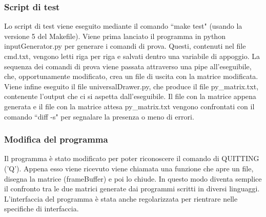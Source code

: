 \documentclass{article}
\begin{document}
	\subsubsection*{Script di test}
	Lo script di test viene eseguito mediante il comando ``make test" (usando la versione 5 del Makefile). Viene prima lanciato il programma in python inputGenerator.py per generare i comandi di prova. Questi,
        contenuti nel file cmd.txt, vengono letti riga per riga e salvati dentro una variabile di appoggio.
        La sequenza dei comandi di prova viene passata attraverso una pipe all'eseguibile, che, opportunamente modificato, crea un file di uscita con la matrice modificata.
        Viene infine eseguito il file universalDrawer.py, che produce il file py\_matrix.txt, contenente l'output che ci si aspetta dall'eseguibile.
        Il file con la matrice appena generata e il file con la matrice attesa py\_matrix.txt vengono confrontati con il comando ``diff -s" per segnalare la presenza o meno di errori.

	\subsubsection*{Modifica del programma}
		Il programma è stato modificato per poter riconoscere il comando di QUITTING ('Q'). Appena esso viene ricevuto
		viene chiamata una funzione che apre un file, disegna la matrice (frameBuffer) e poi lo chiude. In questo modo 
		diventa semplice il confronto tra le due matrici generate dai programmi scritti in diversi linguaggi.
		L'interfaccia del programma è stata anche regolarizzata per rientrare nelle specifiche di interfaccia.
\end{document}
